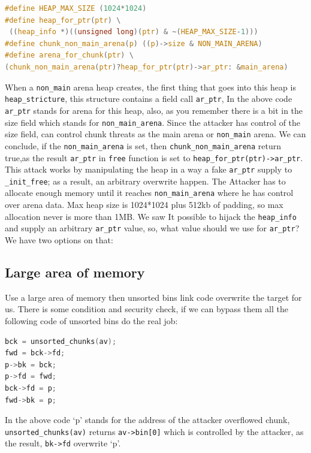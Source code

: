 \documentclass{masterthesis}
\newcommand*\ub{unsorted bins}
\newcommand*\freec{\lstinline{free}\xspace}
\begin{document}
\begin{lstlisting}[language=c,frame=tlrb]
#define HEAP_MAX_SIZE (1024*1024)
#define heap_for_ptr(ptr) \
 ((heap_info *)((unsigned long)(ptr) & ~(HEAP_MAX_SIZE-1)))
#define chunk_non_main_arena(p) ((p)->size & NON_MAIN_ARENA)
#define arena_for_chunk(ptr) \
(chunk_non_main_arena(ptr)?heap_for_ptr(ptr)->ar_ptr: &main_arena)
 \end{lstlisting}

When a \lstinline{non_main} arena heap creates, the first thing that goes into this heap is \lstinline{heap_stricture}, this structure contains a field call \lstinline{ar_ptr}, In the above code \lstinline{ar_ptr} stands for arena for this heap, also, as you remember there is a bit in the size field which stands for \lstinline{non_main_arena}. Since the attacker has control of the size field, can control chunk threats as the main arena or \lstinline{non_main} arena. We can conclude, if the \lstinline{non_main_arena} is set, then \lstinline{chunk_non_main_arena} return true,as the result \lstinline{ar_ptr} in \freec{} function is set to \lstinline{heap_for_ptr(ptr)->ar_ptr}.
This attack works by manipulating the heap in a way a fake \lstinline{ar_ptr} supply to \lstinline{_init_free}; as a result, an arbitrary overwrite happen. The Attacker has to allocate enough memory until it reaches \lstinline{non_main_arena} where he has control over arena data. Max heap size is 1024*1024 plus 512kb of padding, so max allocation never is more than 1MB.
We saw It possible to hijack the \lstinline{heap_info} and supply an arbitrary \lstinline{ar_ptr} value, so, what value should we use for \lstinline{ar_ptr}? We have two options on that:

\subsection{Large area of memory}
Use a large area of memory then \ub{} link code overwrite the target for us. There is some condition and security check, if we can bypass them all the following code of \ub{} do the real job:
\begin{lstlisting}[language=c,frame=tlrb]
bck = unsorted_chunks(av);
fwd = bck->fd;
p->bk = bck;
p->fd = fwd;
bck->fd = p;
fwd->bk = p;
\end{lstlisting}

In the above code ‘p’ stands for the address of the attacker overflowed chunk, \lstinline{unsorted_chunks(av)} returns \lstinline{av->bin[0]} which is controlled by the attacker, as the result, \lstinline{bk->fd} overwrite ‘p’.
\end{document}
